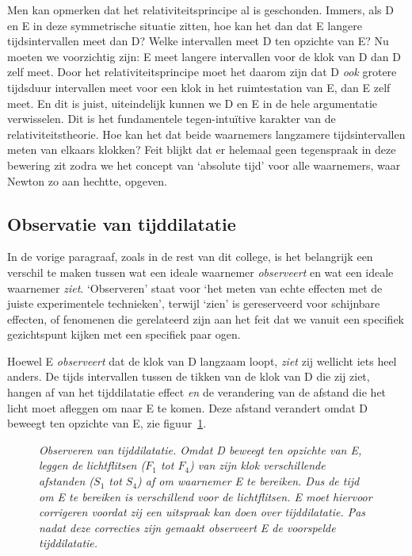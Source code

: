Men kan opmerken dat het relativiteitsprincipe al is
geschonden. Immers, als D en E in deze symmetrische situatie zitten,
hoe kan het dan dat E langere tijdsintervallen meet dan D? Welke
intervallen meet D ten opzichte van E? Nu moeten we voorzichtig zijn:
E meet langere intervallen voor de klok van D dan D zelf meet. Door
het relativiteitsprincipe moet het daarom zijn dat D {\it ook} grotere
tijdsduur intervallen meet voor een klok in het ruimtestation van E,
dan E zelf meet. En dit is juist, uiteindelijk kunnen we D en E in de
hele argumentatie verwisselen. Dit is het fundamentele
tegen-intu\"itive karakter van de relativiteitstheorie. Hoe kan het
dat beide waarnemers langzamere tijdsintervallen meten van elkaars
klokken? Feit blijkt dat er helemaal geen tegenspraak in deze bewering
zit zodra we het concept van `absolute tijd' voor alle waarnemers,
waar Newton zo aan hechtte, opgeven.

\subsection{Observatie van tijddilatatie}
In de vorige paragraaf, zoals in de rest van dit college, is het
belangrijk een verschil te maken tussen wat een ideale waarnemer {\it
observeert} en wat een ideale waarnemer {\it ziet}. `Observeren' staat
voor `het meten van echte effecten met de juiste experimentele
technieken', terwijl `zien' is gereserveerd voor schijnbare effecten,
of fenomenen die gerelateerd zijn aan het feit dat we vanuit een
specifiek gezichtspunt kijken met een specifiek paar ogen.

Hoewel E {\it observeert} dat de klok van D langzaam loopt, {\it ziet}
zij wellicht iets heel anders. De tijds intervallen tussen de tikken
van de klok van D die zij ziet, hangen af van het tijddilatatie effect
{\it en} de verandering van de afstand die het licht moet afleggen om
naar E te komen. Deze afstand verandert omdat D beweegt ten opzichte
van E, zie figuur~\ref{f:tijdpad}.

\begin{figure}[ht]
\centering
\caption{{\sl Observeren van tijddilatatie. Omdat D beweegt ten opzichte
van E, leggen de lichtflitsen ($F_1$ tot $F_4$) van zijn klok
verschillende afstanden ($S_1$ tot $S_4$) af om waarnemer E te
bereiken. Dus de tijd om E te bereiken is verschillend voor de
lichtflitsen. E moet hiervoor corrigeren voordat zij een uitspraak kan
doen over tijddilatatie. Pas nadat deze correcties zijn gemaakt
observeert E de voorspelde tijddilatatie.}}
\label{f:tijdpad}
\end{figure}


